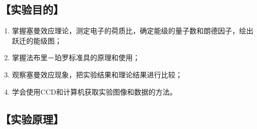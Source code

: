 \documentclass[12pt,a4paper,UTF8]{ctexart}
\begin{document}
\begin{abstract}
  \noindent The Zeeman effect experiment aims to observe the splitting of atomic spectral lines under an external magnetic field, thereby verifying atomic magnetic moments and spatial quantization, 
  as well as determining the electron charge-to-mass ratio ($e/m$), energy-level quantum numbers ($J$, $M$), and the Landé $g$-factor. 
  A pen-type mercury lamp serves as the light source, while an adjustable electromagnet provides a known magnetic field. 
  A Fabry–Pérot interferometer captures high-resolution interference patterns. By recording the subtle changes in the diameters of interference fringes at various magnetic field strengths, 
  the experiment calculates the wavelength shifts of Zeeman-split lines and derives fundamental parameters such as $e/m$ and $g$. 
  Polarizers distinguish between $\pi$ and $\sigma^\pm$ components, enabling the study of spectral polarization in both transverse and longitudinal observation geometries. 
  The procedure integrates Fabry–Pérot interferometry, CCD-based image acquisition, and data analysis to compare measured results with theoretical predictions. 
  This experiment reinforces the theoretical foundation of the Zeeman effect and develops practical skills in high-resolution spectroscopy and image processing, 
  offering a robust approach to probing atomic internal structure.
    
	\noindent \textbf{Keywords: } Zeeman Effect; Fabry–Pérot Interferometer; Charge-to-Mass Ratio; Landé g-Factor; Atomic Level Splitting; Interference Measurement; CCD Image Processing
\end{abstract}


\subsection*{【实验目的】}
\begin{enumerate}[(1)]
    \item 掌握塞曼效应理论，测定电子的荷质比，确定能级的量子数和朗德因子，绘出跃迁的能级图；
    \item 掌握法布里－珀罗标准具的原理和使用；
    \item 观察塞曼效应现象，把实验结果和理论结果进行比较；
    \item 学会使用CCD和计算机获取实验图像和数据的方法。
\end{enumerate}

\subsection*{【实验原理】}
\end{document}
